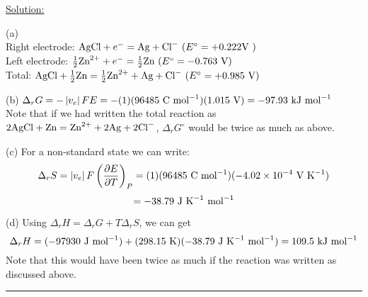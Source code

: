 \noindent
\underline{Solution:}

(a)\\
Right electrode: $\textnormal{AgCl} + e^- = \textnormal{Ag} + \textnormal{Cl}^-\textnormal{ (}E^\circ=+0.222\textnormal{V )}$\\
Left electrode: $\frac{1}{2}\textnormal{Zn}^{2+} + e^- = \frac{1}{2}\textnormal{Zn}\textnormal{ (}E^\circ=-0.763\textnormal{ V)}$\\
Total: $\textnormal{AgCl} + \frac{1}{2}\textnormal{Zn} = \frac{1}{2}\textnormal{Zn}^{2+} + \textnormal{Ag} + \textnormal{Cl}^-\textnormal{ (}E^\circ = +0.985\textnormal{ V)}$

(b) $\Delta_rG = -\left|v_e\right|FE = -(1)(96485\textnormal{ C mol}^{-1})(1.015\textnormal{ V}) = -97.93\textnormal{ kJ mol}^{-1}$\\
Note that if we had written the total reaction as $2\textnormal{AgCl} + \textnormal{Zn} = \textnormal{Zn}^{2+} + 2\textnormal{Ag} + 2\textnormal{Cl}^-$, $\Delta_rG^\circ$ would be twice as much as above.

(c) For a non-standard state we can write:
$$\Delta_rS = \left|v_e\right|F\left(\frac{\partial E}{\partial T}\right)_P = (1)(96485\textnormal{ C mol}^{-1})(-4.02\times 10^{-4}\textnormal{ V K}^{-1})$$
$$ = -38.79\textnormal{ J K}^{-1}\textnormal{ mol}^{-1}$$

(d) Using $\Delta_r H = \Delta_rG + T\Delta_rS$, we can get
$$\Delta_rH = (-97930\textnormal{ J mol}^{-1}) + (298.15\textnormal{ K})(-38.79\textnormal{ J K}^{-1}\textnormal{ mol}^{-1}) = 109.5\textnormal{ kJ mol}^{-1}$$
Note that this would have been twice as much if the reaction was written as discussed above.

\hrule\vspace{0.5cm}
